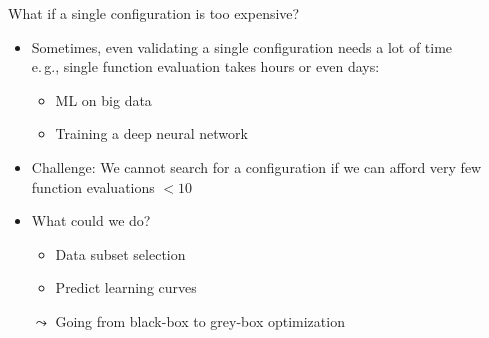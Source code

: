 

\begin{frame}[c,fragile]{What if a single configuration is too expensive?}


\begin{itemize}
  \item Sometimes, even validating a single configuration needs a lot of time\\
  		e.$\,$g., single function evaluation takes hours or even days:
  \begin{itemize}
    \item ML on big data
    \item Training a deep neural network  
  \end{itemize}
  \pause
  \item Challenge: We cannot search for a configuration if we can afford very few function evaluations $< 10$
  \pause
  \item \hands What could we do?
  \pause
  \begin{itemize}
    \item Data subset selection
    \item Predict learning curves
  \end{itemize}
  \item[$\leadsto$] Going from black-box to grey-box optimization
\end{itemize}

\end{frame}

